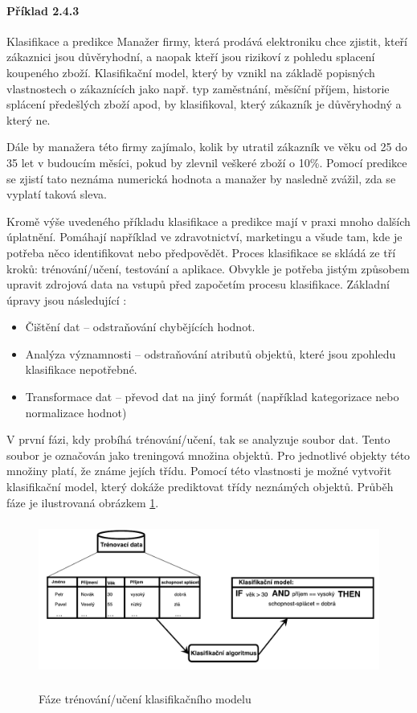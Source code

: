 \paragraph{Příklad 2.4.3} Klasifikace a predikce \newline
Manažer firmy, která prodává elektroniku chce zjistit, kteří zákaznici jsou důvěryhodní, a naopak kteří jsou rizikoví z pohledu splacení koupeného zboží. Klasifikační model, který by vznikl na základě popisných vlastnostech o zákaznících jako např. typ zaměstnání, měsíční příjem, historie splácení předešlých zboží apod, by klasifikoval, který zákazník je důvěryhodný a který ne.

Dále by manažera této firmy zajímalo, kolik by utratil zákazník ve věku od 25 do 35 let v budoucím měsíci, pokud by zlevnil veškeré zboží o 10\%. Pomocí predikce se zjistí tato neznáma numerická hodnota a manažer by nasledně zvážil, zda se vyplatí taková sleva.\newline

Kromě výše uvedeného příkladu klasifikace a predikce mají v praxi mnoho dalších úplatnění. Pomáhají například ve zdravotnictví, marketingu a všude tam, kde je potřeba něco identifikovat nebo předpovědět.
Proces klasifikace se skládá ze tří kroků: trénování/učení, testování a aplikace. Obvykle je potřeba jistým způsobem upravit zdrojová data na vstupů před započetím procesu klasifikace. Základní úpravy jsou následující \cite{Han}:

\begin{itemize}
    \item Čištění dat -- odstraňování chybějících hodnot.
    \item Analýza významnosti -- odstraňování atributů objektů, které jsou zpohledu klasifikace nepotřebné.
    \item Transformace dat -- převod dat na jiný formát (například kategorizace nebo normalizace hodnot)
\end{itemize}

V první fázi, kdy probíhá trénování/učení, tak se analyzuje soubor dat. Tento soubor je označován jako treningová množina objektů. Pro jednotlivé objekty této množiny platí, že známe jejích třídu. Pomocí této vlastnosti je možné vytvořit klasifikační model, který dokáže prediktovat třídy neznámých objektů. Průběh fáze je ilustrovaná obrázkem \ref{faze-trenovani}. \cite{Bharati} 

\begin{figure}[h]\centering
  \centering
  \includegraphics[width=\linewidth,height=2.0in]{obrazky/trenovacifaze.pdf}\\[1pt]
  \caption{Fáze trénování/učení klasifikačního modelu}
  \label{faze-trenovani}
\end{figure}

